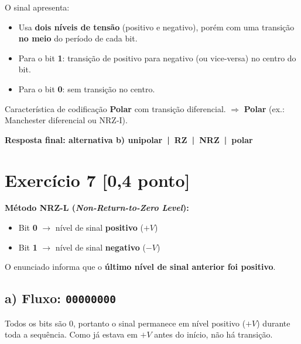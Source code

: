 \documentclass[12pt,a4paper]{article}
\begin{document}
O sinal apresenta:
\begin{itemize}
    \item Usa \textbf{dois níveis de tensão} (positivo e negativo), porém com uma transição \textbf{no meio} do período de cada bit.
    \item Para o bit \textbf{1}: transição de positivo para negativo (ou vice-versa) no centro do bit.
    \item Para o bit \textbf{0}: sem transição no centro.
\end{itemize}
Característica de codificação \textbf{Polar} com transição diferencial.
$\Rightarrow$ \textbf{Polar} (ex.: Manchester diferencial ou NRZ-I).

\begin{mdframed}[backgroundcolor=yellow!15]
\textbf{Resposta final: alternativa b) \quad unipolar~|~RZ~|~NRZ~|~polar}
\end{mdframed}

\vspace{1em}

\section*{Exercício 7 \hfill \normalfont\small[0,4 ponto]}

\textbf{Método NRZ-L (\textit{Non-Return-to-Zero Level}):}
\begin{itemize}
    \item Bit \textbf{0} $\rightarrow$ nível de sinal \textbf{positivo} ($+V$)
    \item Bit \textbf{1} $\rightarrow$ nível de sinal \textbf{negativo} ($-V$)
\end{itemize}

O enunciado informa que o \textbf{último nível de sinal anterior foi positivo}.

\vspace{1em}

\subsection*{a) Fluxo: \texttt{00000000}}

Todos os bits são 0, portanto o sinal permanece em nível positivo ($+V$) durante toda a sequência. Como já estava em $+V$ antes do início, não há transição.
\end{document}
